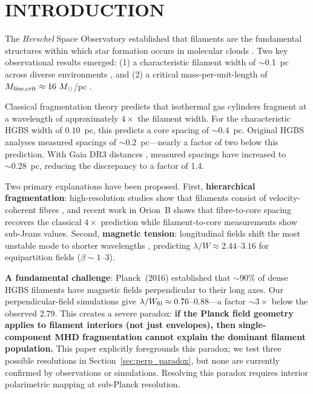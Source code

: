 \documentclass[twoside,twocolumn]{mnras}
\begin{document}
\section{INTRODUCTION}

The \textit{Herschel} Space Observatory established that filaments are the fundamental
structures within which star formation occurs in molecular clouds \citep{Andre2010}.
Two key observational results emerged: (1) a characteristic filament width of $\sim$0.1~pc
across diverse environments \citep{Arzoumanian2011}, and (2) a critical mass-per-unit-length
of $M_{\rm line,crit} \approx 16~M_\odot$/pc \citep{Ostriker1964}.

Classical fragmentation theory \citep{Inutsuka1992} predicts that isothermal gas cylinders
fragment at a wavelength of approximately $4\times$ the filament width. For the
characteristic HGBS width of $0.10$~pc, this predicts a core spacing of $\sim 0.4$~pc.
Original HGBS analyses measured spacings of $\sim 0.2$~pc---nearly a factor of two below
this prediction. With Gaia DR3 distances \citep{Zhang2023}, measured spacings have
increased to $\sim 0.28$~pc, reducing the discrepancy to a factor of 1.4.

Two primary explanations have been proposed. First, \textbf{hierarchical fragmentation}:
high-resolution studies show that filaments consist of velocity-coherent fibres
\citep{Hacar2013}, and recent work in Orion~B \citep{Yang2024} shows that fibre-to-core
spacing recovers the classical $4\times$ prediction while filament-to-core measurements
show sub-Jeans values. Second, \textbf{magnetic tension}: longitudinal fields shift the
most unstable mode to shorter wavelengths \citep{Nakamura1993}, predicting
$\lambda/W \approx 2.44$--$3.16$ for equipartition fields ($\beta \sim 1$--$3$).

\textbf{A fundamental challenge}: Planck~(2016) established that ${\sim}90\%$ of dense HGBS filaments have magnetic fields perpendicular to their long axes. Our perpendicular-field simulations give $\lambda/W_{\rm fil} \approx 0.76$--$0.88$---a factor ${\sim}3\times$ below the observed $2.79$. This creates a severe paradox: \textbf{if the Planck field geometry applies to filament interiors (not just envelopes), then single-component MHD fragmentation cannot explain the dominant filament population.} This paper explicitly foregrounds this paradox; we test three possible resolutions in Section~\ref{sec:perp_paradox}, but none are currently confirmed by observations or simulations. Resolving this paradox requires interior polarimetric mapping at sub-Planck resolution.
\end{document}

